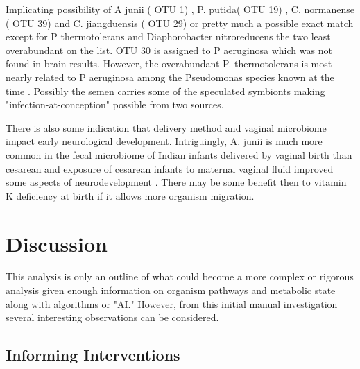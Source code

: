 \documentclass[aps,secnumarabic,balancelastpage,amsmath,amssymb,nofootinbib]{revtex4}
\begin{document}
Implicating possibility of A junii ( OTU 1) , P. putida( OTU 19) ,
C. normanense ( OTU 39) and C. jiangduensis ( OTU 29) or pretty
much a possible exact match except for P thermotolerans
and Diaphorobacter nitroreducens the two least overabundant on the list.  
OTU 30 is assigned to P aeruginosa which was not found in brain results. 
However, the overabundant P. thermotolerans is most nearly related to
P aeruginosa among the Pseudomonas species known at the time
\cite{Manaia_BMoore_Pseudomonas_thermotolerans_2002}.
Possibly the semen carries some of the speculated symbionts
\cite{Koort_Sosa_Turk_Lactobacillus_crispatus_2023}
\cite{10.3389/fcimb.2022.815786}
making "infection-at-conception" possible from two sources. 

There is also some indication that delivery method
and vaginal microbiome impact early neurological development.
Intriguingly, A. junii  is much more common in the fecal microbiome of
Indian infants delivered by vaginal birth than cesarean \cite{Pandey2012}
and exposure of cesarean infants to maternal vaginal fluid
improved some aspects of neurodevelopment 
\cite{Zhou_Qiu_Wang_Effects_vaginal_microbiota_2023}.
There may be some benefit then to vitamin K deficiency
at birth if it allows more organism migration. 

\section{Discussion  }

This analysis is only an outline of what could become
a more complex or rigorous analysis given enough
information on organism pathways and metabolic state
along with algorithms or "AI."
However, from this initial manual investigation 
several interesting observations can be considered.

\subsection{Informing Interventions   }
\end{document}
